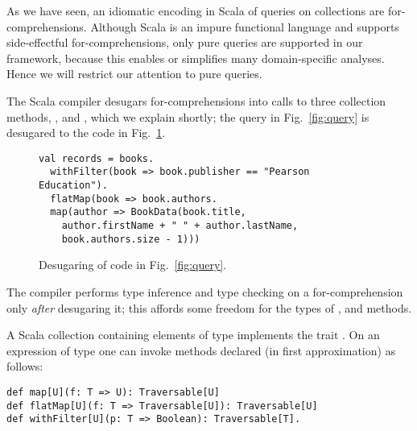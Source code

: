 

As we have seen, an idiomatic encoding in Scala of queries on collections are for-comprehensions. Although Scala is an impure functional language and supports side-effectful for-comprehensions, only pure queries are supported in our framework, because this enables or simplifies many domain-specific analyses. Hence we will restrict our attention to pure queries.

The Scala compiler desugars for-comprehensions into calls to three collection methods, ,  and , which we explain shortly; the query in Fig.~\ref{fig:query} is desugared to the code in Fig.~\ref{fig:desugaredQuery}.
\begin{figure}
\begin{center}
\begin{lstlisting}
val records = books.
  withFilter(book => book.publisher == "Pearson Education").
  flatMap(book => book.authors.
  map(author => BookData(book.title,
    author.firstName + " " + author.lastName,
    book.authors.size - 1)))
\end{lstlisting}
\end{center}
\caption{Desugaring of code in Fig.~\ref{fig:query}.}
\label{fig:desugaredQuery}
\end{figure}

The compiler performs type inference and type checking on a for-comprehension only \emph{after} desugaring it; this affords some freedom for the types of ,  and  methods.

A Scala collection containing elements of type  implements the trait .
On an expression  of type  one can invoke methods declared (in first approximation) as follows:
\begin{lstlisting}
def map[U](f: T => U): Traversable[U]
def flatMap[U](f: T => Traversable[U]): Traversable[U]
def withFilter[U](p: T => Boolean): Traversable[T].
\end{lstlisting}

